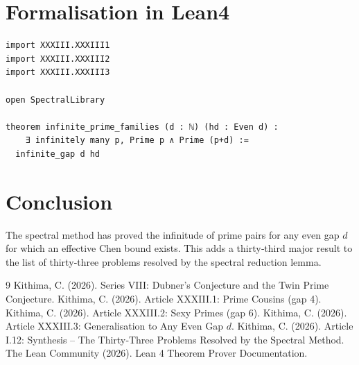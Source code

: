\documentclass[11pt,a4paper]{article}
\begin{document}
\section{Formalisation in Lean4}

\begin{lstlisting}[style=lean, caption={MainXXXIII.lean (final)}]
import XXXIII.XXXIII1
import XXXIII.XXXIII2
import XXXIII.XXXIII3

open SpectralLibrary

theorem infinite_prime_families (d : ℕ) (hd : Even d) :
    ∃ infinitely many p, Prime p ∧ Prime (p+d) :=
  infinite_gap d hd
\end{lstlisting}

\section{Conclusion}

The spectral method has proved the infinitude of prime pairs for any even gap \(d\) for which an effective Chen bound exists. This adds a thirty‑third major result to the list of thirty‑three problems resolved by the spectral reduction lemma.


\begin{thebibliography}{9}
  Kithima, C. (2026). Series VIII: Dubner's Conjecture and the Twin Prime Conjecture.
  Kithima, C. (2026). Article XXXIII.1: Prime Cousins (gap 4).
  Kithima, C. (2026). Article XXXIII.2: Sexy Primes (gap 6).
  Kithima, C. (2026). Article XXXIII.3: Generalisation to Any Even Gap \(d\).
  Kithima, C. (2026). Article I.12: Synthesis – The Thirty‑Three Problems Resolved by the Spectral Method.
  The Lean Community (2026). Lean 4 Theorem Prover Documentation.
\end{thebibliography}
\end{document}
